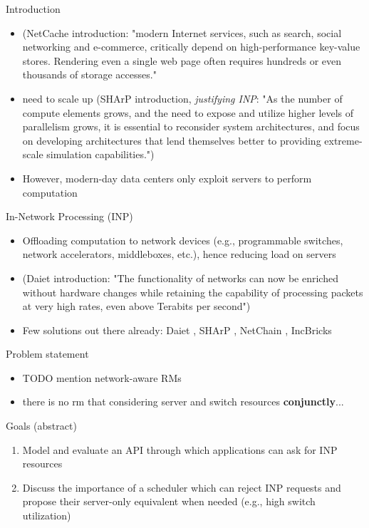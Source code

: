 \begin{frame}[fragile]{Introduction}
    \begin{itemize}
        \item (NetCache introduction: "modern Internet services, such as search, social networking and e-commerce, critically depend on high-performance key-value stores. Rendering even a single web page often requires hundreds or even thousands of storage accesses." \cite{netchain}
        \item need to scale up (SHArP introduction, \textit{justifying INP}: "As the number of compute elements grows, and the need to expose and utilize higher levels of parallelism grows, it is essential to reconsider system architectures, and focus on developing architectures that lend themselves better to providing extreme-scale simulation capabilities.") \cite{sharp}
        \item However, modern-day data centers only exploit servers to perform computation %
    \end{itemize}
\end{frame}

\begin{frame}[fragile]{In-Network Processing (INP)}
    \begin{itemize}
        \item Offloading computation to network devices (e.g., programmable switches, network accelerators, middleboxes, etc.), hence reducing load on servers
        \item (Daiet introduction: "The functionality of networks can now be enriched without hardware changes while retaining the capability of processing packets at very high rates, even above Terabits per second") \cite{daiet}
        \item Few solutions out there already: Daiet \cite{daiet}, SHArP \cite{sharp}, NetChain \cite{netchain}, IncBricks \cite{incbricks}
    \end{itemize}
\end{frame}

\begin{frame}[fragile]{Problem statement}
    \begin{itemize}
        \item TODO mention network-aware RMs %
        \item there is no \gls{rm} that considering server and switch resources \textbf{conjunctly}...
    \end{itemize}
\end{frame}

\begin{frame}[fragile]{Goals}
(abstract)
    \begin{enumerate}
        \item Model and evaluate an API through which applications can ask for INP resources
        \item Discuss the importance of a scheduler which can reject INP requests and propose their server-only equivalent when needed (e.g., high switch utilization)
    \end{enumerate}
\end{frame}
